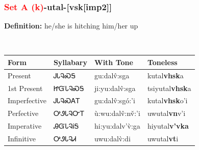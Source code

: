 \subsubsection*{\textcolor{Red}{Set A (k)}{-}\textbf{utal}{-}[vsk[imp2]]}
\nopagebreak
\textbf{Definition: } he/she is hitching him/her up
\\[0.5em]
\begin{tabularx}{\textwidth}{l X X X}%
\toprule%
\textbf{Form}&\textbf{Syllabary}&\textbf{With Tone}&\textbf{Toneless}\\%
\midrule%
Present&ᎫᏓᎸᏍᎦ&gu:dalv̂:sga&kutal\textbf{vhsk}a\\%
1st Present&ᏥᏳᏓᎸᏍᎦ&ji:yu:dalv̂:sga&tsiyutal\textbf{vhsk}a\\%
Imperfective&ᎫᏓᎸᏍᎪᎢ&gu:dalv̂:sgó:’i&kutal\textbf{vhsk}o'i\\%
Perfective&ᎤᏭᏓᎸᏅᎢ&ù:wu:dalv̂:nv̌:’i&uwutal\textbf{vn}v'i\\%
Imperative&ᎯᏳᏓᎸᎥᎦ&hi:yu:dalv’v̀:ga&hiyutal\textbf{v'vka}\\%
Infinitive&ᎤᏭᏓᎸᏗ&uwu:dalv̀:di&uwutal\textbf{vt}i\\%
\bottomrule%
\end{tabularx}
\\[1em]